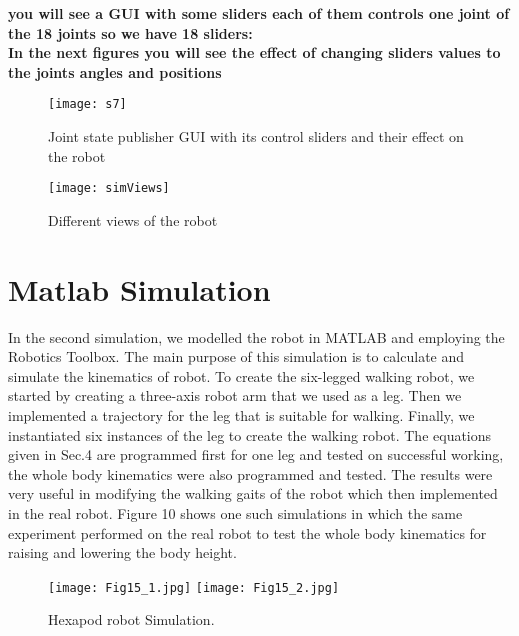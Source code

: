 \textbf{you will see a GUI with some sliders each of them controls one joint of the 18 joints so we have 18 sliders:}
\\\textbf{In the next figures you will see the effect of changing sliders values to the joints angles and positions}
\begin{figure}[H]
	\centering
	\texttt{[image: s7]}
	\caption{Joint state publisher GUI with its control sliders and their effect on the robot }
	\label{fig:s7}
\end{figure}
\begin{figure}[htb]
	\centering
	\texttt{[image: simViews]}
	\caption{Different views of the robot}
\end{figure}
\section{ Matlab Simulation}
In the second simulation, we modelled the robot in MATLAB and employing the Robotics Toolbox. The main purpose of this simulation is to calculate and simulate the kinematics of robot. To create the six-legged walking robot, we started by creating a three-axis robot arm that we used as a leg. Then we implemented a trajectory for the leg that is suitable for walking. Finally, we instantiated six instances of the leg to create the walking robot. The equations given in Sec.4 are programmed first for one leg and tested on successful working, the whole body kinematics were also programmed and tested.
The results were very useful in modifying the walking gaits of the robot which then implemented in the real robot. Figure 10 shows one such simulations in which the same experiment performed on the real robot to test the whole body kinematics for raising and lowering the body height.
\begin{figure}[H]
	\centering
	\texttt{[image: Fig15\_1.jpg]} 
	\texttt{[image: Fig15\_2.jpg]}
	\caption{ Hexapod robot Simulation.}
	\label{sim}
\end{figure}

